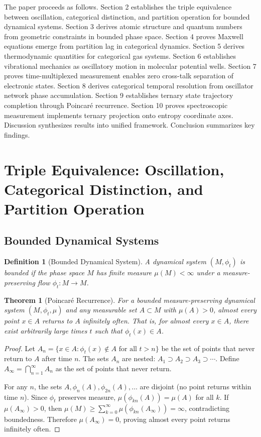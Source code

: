 \documentclass[twocolumn,10pt]{article}
\newtheorem{theorem}{Theorem}[section]
\newtheorem{definition}{Definition}[section]
\begin{document}
The paper proceeds as follows. Section 2 establishes the triple equivalence between oscillation, categorical distinction, and partition operation for bounded dynamical systems. Section 3 derives atomic structure and quantum numbers from geometric constraints in bounded phase space. Section 4 proves Maxwell equations emerge from partition lag in categorical dynamics. Section 5 derives thermodynamic quantities for categorical gas systems. Section 6 establishes vibrational mechanics as oscillatory motion in molecular potential wells. Section 7 proves time-multiplexed measurement enables zero cross-talk separation of electronic states. Section 8 derives categorical temporal resolution from oscillator network phase accumulation. Section 9 establishes ternary state trajectory completion through Poincar\'e recurrence. Section 10 proves spectroscopic measurement implements ternary projection onto entropy coordinate axes. Discussion synthesizes results into unified framework. Conclusion summarizes key findings.

\section{Triple Equivalence: Oscillation, Categorical Distinction, and Partition Operation}

\subsection{Bounded Dynamical Systems}

\begin{definition}[Bounded Dynamical System]
A dynamical system $(M, \phi_t)$ is bounded if the phase space $M$ has finite measure $\mu(M) < \infty$ under a measure-preserving flow $\phi_t: M \to M$.
\end{definition}

\begin{theorem}[Poincar\'e Recurrence]
\label{thm:poincare}
For a bounded measure-preserving dynamical system $(M, \phi_t, \mu)$ and any measurable set $A \subset M$ with $\mu(A) > 0$, almost every point $x \in A$ returns to $A$ infinitely often. That is, for almost every $x \in A$, there exist arbitrarily large times $t$ such that $\phi_t(x) \in A$.
\end{theorem}

\begin{proof}
Let $A_n = \{x \in A : \phi_t(x) \notin A \text{ for all } t > n\}$ be the set of points that never return to $A$ after time $n$. The sets $A_n$ are nested: $A_1 \supset A_2 \supset A_3 \supset \cdots$. Define $A_\infty = \bigcap_{n=1}^\infty A_n$ as the set of points that never return.

For any $n$, the sets $A, \phi_n(A), \phi_{2n}(A), \ldots$ are disjoint (no point returns within time $n$). Since $\phi_t$ preserves measure, $\mu(\phi_{kn}(A)) = \mu(A)$ for all $k$. If $\mu(A_\infty) > 0$, then $\mu(M) \geq \sum_{k=0}^\infty \mu(\phi_{kn}(A_\infty)) = \infty$, contradicting boundedness. Therefore $\mu(A_\infty) = 0$, proving almost every point returns infinitely often.
\end{proof}
\end{document}
